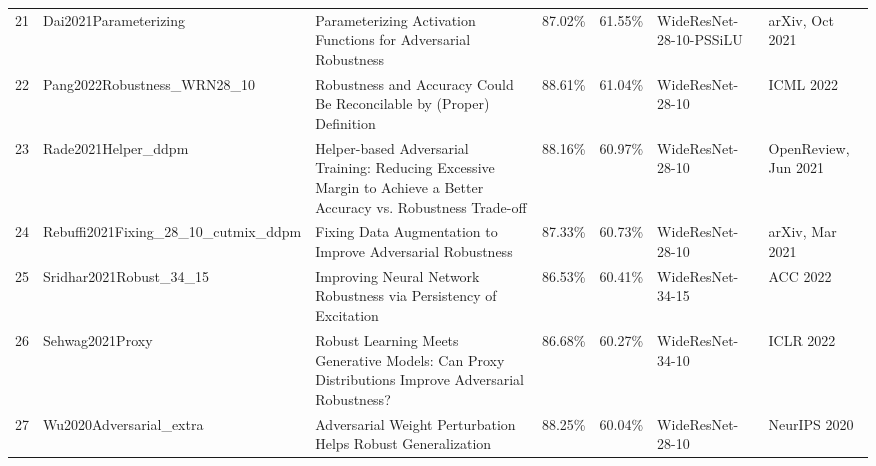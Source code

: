 \begin{table}[]
\begin{tabular}{lllllll}
    21 & Dai2021Parameterizing                    & Parameterizing Activation Functions for Adversarial Robustness                                                     & 87.02\%        & 61.55\%         & WideResNet-28-10-PSSiLU                                           & arXiv, Oct 2021                                            \\
    22 & Pang2022Robustness\_WRN28\_10            & Robustness and Accuracy Could Be Reconcilable by (Proper) Definition                                               & 88.61\%        & 61.04\%         & WideResNet-28-10                                                  & ICML 2022                                                  \\
    23 & Rade2021Helper\_ddpm                     & Helper-based Adversarial Training: Reducing Excessive Margin to Achieve a Better Accuracy vs. Robustness Trade-off & 88.16\%        & 60.97\%         & WideResNet-28-10                                                  & OpenReview, Jun 2021                                       \\
    24 & Rebuffi2021Fixing\_28\_10\_cutmix\_ddpm  & Fixing Data Augmentation to Improve Adversarial Robustness                                                         & 87.33\%        & 60.73\%         & WideResNet-28-10                                                  & arXiv, Mar 2021                                            \\
    25 & Sridhar2021Robust\_34\_15                & Improving Neural Network Robustness via Persistency of Excitation                                                  & 86.53\%        & 60.41\%         & WideResNet-34-15                                                  & ACC 2022                                                   \\
    26 & Sehwag2021Proxy                          & Robust Learning Meets Generative Models: Can Proxy Distributions Improve Adversarial Robustness?                   & 86.68\%        & 60.27\%         & WideResNet-34-10                                                  & ICLR 2022                                                  \\
    27 & Wu2020Adversarial\_extra                 & Adversarial Weight Perturbation Helps Robust Generalization                                                        & 88.25\%        & 60.04\%         & WideResNet-28-10                                                  & NeurIPS 2020                                               \\

\end{tabular}
\end{table}
